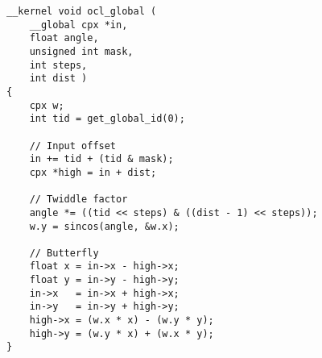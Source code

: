 \begin{lstlisting}
__kernel void ocl_global (
    __global cpx *in,
    float angle,
    unsigned int mask,
    int steps,
    int dist )
{
    cpx w;
    int tid = get_global_id(0);
    
    // Input offset
    in += tid + (tid & mask);
    cpx *high = in + dist;
        
    // Twiddle factor
    angle *= ((tid << steps) & ((dist - 1) << steps));
    w.y = sincos(angle, &w.x);
    
    // Butterfly
    float x = in->x - high->x;
    float y = in->y - high->y;
    in->x   = in->x + high->x;
    in->y   = in->y + high->y;
    high->x = (w.x * x) - (w.y * y);
    high->y = (w.y * x) + (w.x * y);
}
\end{lstlisting}